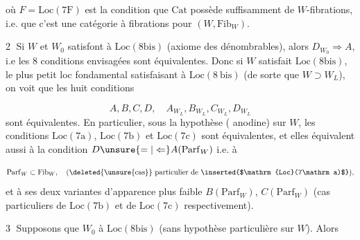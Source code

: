 
où $F=\mathrm{Loc}(7\mathrm F)$ est la condition que $\mathrm{Cat}$ possède suffisamment de $W$-fibrations, i.e. que c'est une catégorie à fibrations pour $(W,\mathrm{Fib}_W)$.

\textcircled{2} Si $W$ et $W_0$ satisfont à $\mathrm{Loc}(8\mathrm{bis})$ (axiome des  dénombrables), alors  $D_{W_0}\Longrightarrow A$, i.e les 8 conditions envisagées sont équivalentes. Donc si $W$ satisfait $\mathrm{Loc}(8\mathrm{bis})$,  le plus petit loc fondamental  satisfaisant à $\mathrm{Loc}(8\ \mathrm{bis})$ (de sorte que $W\supset W_L$), on voit que les huit conditions

\[
 A,B,C,D,\quad A_{W_L},B_{W_L},C_{W_L},D_{W_L}
\]
sont équivalentes. En particulier, sous la hypothèse ( anodine) sur $W$, les conditions  $\mathrm{Loc}(7\mathrm a)$, $\mathrm{Loc}(7\mathrm b)$ et $\mathrm{Loc}(7\mathrm c)$ sont équivalentes, et elles équivalent aussi à la condition $D\unsure{=|\Leftarrow}A(\mathrm{Parf}_W)$ i.e. à

\[
 \mathrm{Parf}_W\subset\mathrm{Fib}_W,\quad\text{(\deleted{\unsure{cas}} particulier de \inserted{$\mathrm{Loc}(7\mathrm a)$}),}
\]
et à ses deux variantes  d'apparence plus faible $B(\mathrm{Parf}_W)$, $C(\mathrm{Parf}_W)$ (cas particuliers de $\mathrm{Loc}(7\mathrm b)$ et de $\mathrm{Loc}(7\mathrm c)$ respectivement).

\textcircled{3} Supposons que $W_0$  à $\mathrm{Loc}(8\mathrm{bis})$ (sans hypothèse particulière sur $W$). Alors
